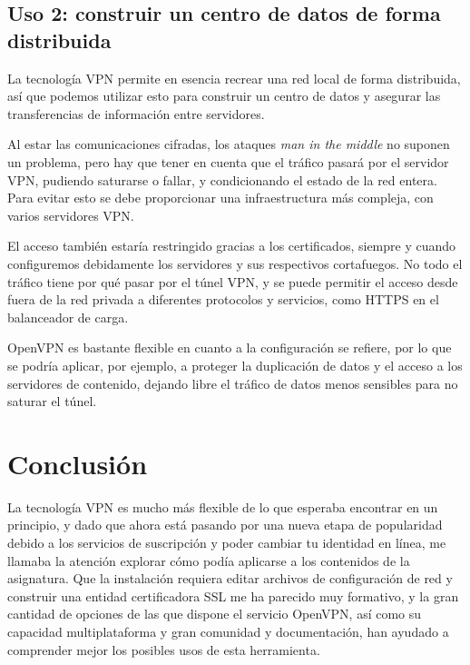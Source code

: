 \documentclass[11pt,a4paper]{article}
\begin{document}
\subsection{Uso 2: construir un centro de datos de forma distribuida}

La tecnología VPN permite en esencia recrear una red local de forma distribuida, así que podemos utilizar esto para construir un centro de datos y asegurar las transferencias de información entre servidores.

\medskip

Al estar las comunicaciones cifradas, los ataques \textit{man in the middle} no suponen un problema, pero hay que tener en cuenta que el tráfico pasará por el servidor VPN, pudiendo saturarse o fallar, y condicionando el estado de la red entera. Para evitar esto se debe proporcionar una infraestructura más compleja, con varios servidores VPN.

\medskip

El acceso también estaría restringido gracias a los certificados, siempre y cuando configuremos debidamente los servidores y sus respectivos cortafuegos. No todo el tráfico tiene por qué pasar por el túnel VPN, y se puede permitir el acceso desde fuera de la red privada a diferentes protocolos y servicios, como HTTPS en el balanceador de carga. 

\medskip

OpenVPN es bastante flexible en cuanto a la configuración se refiere, por lo que se podría aplicar, por ejemplo, a proteger la duplicación de datos y el acceso a los servidores de contenido, dejando libre el tráfico de datos menos sensibles para no saturar el túnel.

\section{Conclusión}

La tecnología VPN es mucho más flexible de lo que esperaba encontrar en un principio, y dado que ahora está pasando por una nueva etapa de popularidad debido a los servicios de suscripción y poder cambiar tu identidad en línea, me llamaba la atención explorar cómo podía aplicarse a los contenidos de la asignatura. Que la instalación requiera editar archivos de configuración de red y construir una entidad certificadora SSL me ha parecido muy formativo, y la gran cantidad de opciones de las que dispone el servicio OpenVPN, así como su capacidad multiplataforma y gran comunidad y documentación, han ayudado a comprender mejor los posibles usos de esta herramienta.
\end{document}
